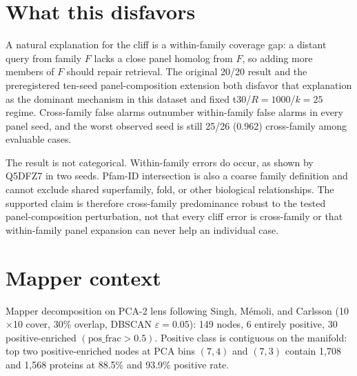 \documentclass[11pt]{article}
\begin{document}
\section{What this disfavors}
A natural explanation for the cliff is a within-family coverage gap: a distant query from family $F$ lacks a close panel homolog from $F$, so adding more members of $F$ should repair retrieval. The original 20/20 result and the preregistered ten-seed panel-composition extension both disfavor that explanation as the dominant mechanism in this dataset and fixed t30/$R{=}1000$/$k{=}25$ regime. Cross-family false alarms outnumber within-family false alarms in every panel seed, and the worst observed seed is still 25/26 (0.962) cross-family among evaluable cases.

The result is not categorical. Within-family errors do occur, as shown by Q5DFZ7 in two seeds. Pfam-ID intersection is also a coarse family definition and cannot exclude shared superfamily, fold, or other biological relationships. The supported claim is therefore cross-family predominance robust to the tested panel-composition perturbation, not that every cliff error is cross-family or that within-family panel expansion can never help an individual case.

\section{Mapper context}
Mapper decomposition on PCA-2 lens following Singh, M\'emoli, and Carlsson \cite{singh2007topological,carlsson2009topology,edelsbrunner2010computational} (10$\times$10 cover, 30\% overlap, DBSCAN $\varepsilon{=}0.05$): 149 nodes, 6 entirely positive, 30 positive-enriched $(\text{pos\_frac} > 0.5)$. Positive class is contiguous on the manifold: top two positive-enriched nodes at PCA bins $(7,4)$ and $(7,3)$ contain 1{,}708 and 1{,}568 proteins at 88.5\% and 93.9\% positive rate.
\end{document}
